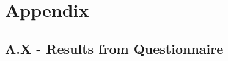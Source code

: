 \chapter{Appendix}\label{ch:appAlabel}

\section*{A.X - Results from Questionnaire}

\clearpage

%
%
